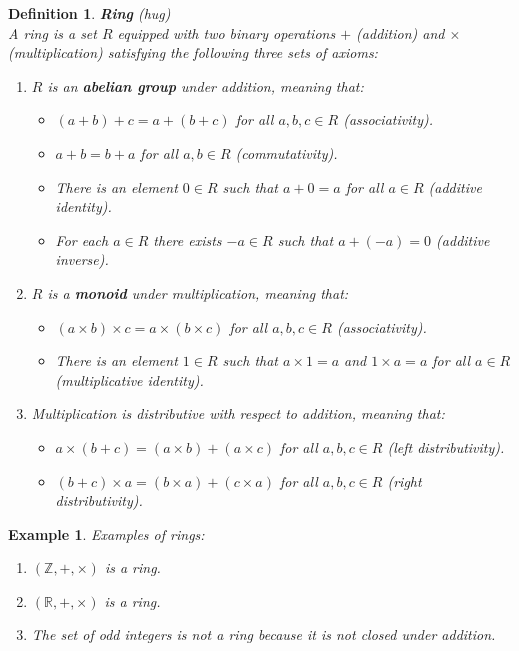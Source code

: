 \documentclass[11pt]{book} %
\newtheorem{definition}{Definition}[section]
\newtheorem*{example*}{Example}
\begin{document}
\begin{definition}{\textbf{Ring} (hug)} \\
    A ring is a set \(R\) equipped with two binary operations \(+\) (addition) and \(\times\) (multiplication) satisfying the following three sets of axioms:
    \begin{enumerate}
        \item \(R\) is an \textbf{abelian group} under addition, meaning that:
        \begin{itemize}
            \item \((a + b) + c = a + (b + c)\) for all \(a, b, c \in R\) (associativity).
            \item \(a + b = b + a\) for all \(a, b \in R\) (commutativity).
            \item There is an element \(0 \in R\) such that \(a + 0 = a\) for all \(a \in R\) (additive identity).
            \item For each \(a \in R\) there exists \(-a \in R\) such that \(a + (-a) = 0\) (additive inverse).
        \end{itemize}
        \item \(R\) is a \textbf{monoid} under multiplication, meaning that:
        \begin{itemize}
            \item \((a \times b) \times c = a \times (b \times c)\) for all \(a, b, c \in R\) (associativity).
            \item There is an element \(1 \in R\) such that \(a \times 1 = a\) and \(1 \times a = a\) for all \(a \in R\) (multiplicative identity).
        \end{itemize}
        \item Multiplication is distributive with respect to addition, meaning that:
        \begin{itemize}
            \item \(a \times (b + c) = (a \times b) + (a \times c)\) for all \(a, b, c \in R\) (left distributivity).
            \item \((b + c) \times a = (b \times a) + (c \times a)\) for all \(a, b, c \in R\) (right distributivity).
        \end{itemize}
    \end{enumerate}

\end{definition}

\begin{example*}
Examples of rings:
\begin{enumerate}
\item \( (\mathbb{Z}, +, \times) \) is a ring.
\item \( (\mathbb{R}, +, \times) \) is a ring.
\item The set of odd integers is not a ring because it is not closed under addition.
\end{enumerate}
\end{example*}
\end{document}

